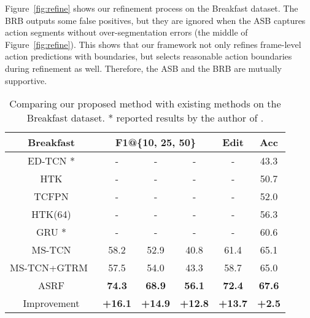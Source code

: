 \documentclass[10pt,twocolumn,letterpaper]{article}
\begin{document}
Figure~\ref{fig:refine} shows our refinement process on the Breakfast dataset.
The BRB outputs some false positives, but they are ignored when the ASB captures action segments without over-segmentation errors (the middle of Figure~\ref{fig:refine}).
This shows that our framework not only refines frame-level action predictions with boundaries,
but selects reasonable action boundaries during refinement as well. 
Therefore, the ASB and the BRB are mutually supportive.


\begin{table}[t!]
\small
\centering
\begin{tabular}{cccccc}
\hline
Breakfast          & \multicolumn{3}{c}{F1@\{10, 25, 50\}} & Edit   & Acc   \\ \hline
ED-TCN \cite{tcn} *           & -          & -          & -          & -       & 43.3  \\ 
HTK \cite{htk}                & -          & -          & -          & -       & 50.7  \\ 
TCFPN \cite{softboundary}     & -          & -          & -          & -       & 52.0  \\ 
HTK(64) \cite{markov1}        & -          & -          & -          & -       & 56.3  \\ 
GRU \cite{softboundary} *     & -          & -          & -          & -       & 60.6  \\ 
MS-TCN \cite{mstcn}           & 58.2       & 52.9       & 40.8       & 61.4    & 65.1  \\ 
MS-TCN+GTRM~\cite{as_graph}   & 57.5       & 54.0       & 43.3       & 58.7    & 65.0     \\\hline
ASRF                          & \textbf{74.3}   & \textbf{68.9}   & \textbf{56.1}  &    \textbf{72.4} & \textbf{67.6}   \\ 
\rowcolor[gray]{0.90}
Improvement                   & \textbf{+16.1}       & \textbf{+14.9}    & \textbf{+12.8}   & \textbf{+13.7}  & \textbf{+2.5} \\ \hline
\end{tabular}
\caption{Comparing our proposed method with existing methods on the Breakfast dataset. * reported results by the author of \cite{softboundary}.}
\label{tab:breakfast}
\vspace{-10pt}
\end{table}
\end{document}

